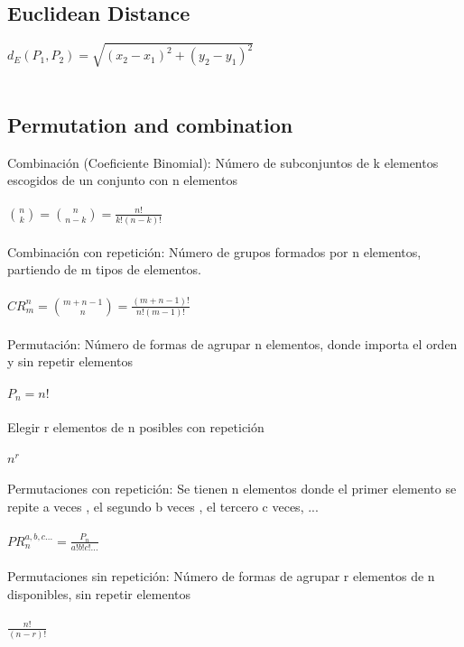 \documentclass[11pt,letterpaper,twocolumn,twosided]{article}
\begin{document}
\subsection{Euclidean Distance}

$ d_{E}(P_{1},P_{2}) = \sqrt{(x_{2}-x_{1})^{2}+(y_{2}-y_{1})^{2}} $
\\ \\



\subsection{Permutation and combination}

Combinaci\'on (Coeficiente Binomial): N\'umero de subconjuntos de k elementos escogidos de un conjunto con n elementos
\\ \\
{\LARGE $ \binom{n}{k} = \binom{n}{n-k} = \frac{n!}{k!(n-k)!} $}
\\ \\
Combinaci\'on con repetici\'on: N\'umero de grupos formados por n elementos, partiendo de m tipos de elementos.
\\ \\
{\LARGE $ CR_{m}^{n} = \binom{m+n-1}{n} = \frac{(m + n - 1)!}{n!(m-1)!} $}
\\ \\
Permutaci\'on: N\'umero de formas de agrupar n elementos, donde importa el orden y sin repetir elementos
\\ \\
{\LARGE $ P_{n} = n! $}
\\ \\
Elegir r elementos de n posibles con repetici\'on
\\ \\
{\LARGE $ n^{r} $}
\\ \\
Permutaciones con repetici\'on: Se tienen n elementos donde el primer elemento se repite a veces , el segundo b veces , el tercero c veces, ...
\\ \\
{\LARGE $ PR_{n}^{a,b,c...} = \frac{P_{n}}{a!b!c!...}$}
\\ \\
Permutaciones sin repetici\'on: N\'umero de formas de agrupar r elementos de n disponibles, sin repetir elementos 
\\ \\
{\LARGE $ \frac{n!}{(n-r)!}$}
\\ \\
\end{document}
